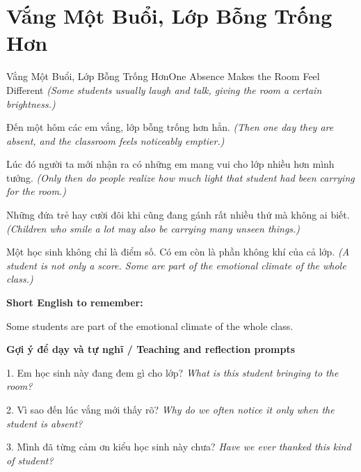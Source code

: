 \section{Vắng Một Buổi, Lớp Bỗng Trống Hơn}
\begin{truyen}{Vắng Một Buổi, Lớp Bỗng Trống Hơn}{One Absence Makes the Room Feel Different}
\textit{(Some students usually laugh and talk, giving the room a certain brightness.)}

Đến một hôm các em vắng, lớp bỗng trống hơn hẳn.
\textit{(Then one day they are absent, and the classroom feels noticeably emptier.)}

Lúc đó người ta mới nhận ra có những em mang vui cho lớp nhiều hơn mình tưởng.
\textit{(Only then do people realize how much light that student had been carrying for the room.)}

Những đứa trẻ hay cười đôi khi cũng đang gánh rất nhiều thứ mà không ai biết.
\textit{(Children who smile a lot may also be carrying many unseen things.)}

\end{truyen}

\begin{baihoc}
Một học sinh không chỉ là điểm số. Có em còn là phần không khí của cả lớp.
\textit{(A student is not only a score. Some are part of the emotional climate of the whole class.)}
\end{baihoc}

\begin{ghinhoanh}
\textbf{Short English to remember:}

Some students are part of the emotional climate of the whole class.

\end{ghinhoanh}

\begin{tuhocnhanh}
\textbf{Gợi ý để dạy và tự nghĩ / Teaching and reflection prompts}

1. Em học sinh này đang đem gì cho lớp? \textit{What is this student bringing to the room?}

2. Vì sao đến lúc vắng mới thấy rõ? \textit{Why do we often notice it only when the student is absent?}

3. Mình đã từng cảm ơn kiểu học sinh này chưa? \textit{Have we ever thanked this kind of student?}
\end{tuhocnhanh}
\ngancach

